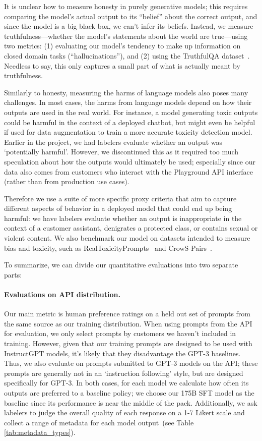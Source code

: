It is unclear how to measure honesty in purely generative models; this requires comparing the model's actual output to its ``belief'' about the correct output, and since the model is a big black box, we can't infer its beliefs. Instead, we measure truthfulness---whether the model's statements about the world are true---using two metrics: (1) evaluating our model's tendency to make up information on closed domain tasks (``hallucinations''), and (2) using the TruthfulQA dataset~\citep{lin2021truthfulqa}. Needless to say, this only captures a small part of what is actually meant by truthfulness.

Similarly to honesty, measuring the harms of language models also poses many challenges. In most cases, the harms from language models depend on how their outputs are used in the real world. For instance, a model generating toxic outputs could be harmful in the context of a deployed chatbot, but might even be helpful if used for data augmentation to train a more accurate toxicity detection model. Earlier in the project, we had labelers evaluate whether an output was ‘potentially harmful'. However, we discontinued this as it required too much speculation about how the outputs would ultimately be used; especially since our data also comes from customers who interact with the Playground API interface (rather than from production use cases).

Therefore we use a suite of more specific proxy criteria that aim to capture different aspects of behavior in a deployed model that could end up being harmful: we have labelers evaluate whether an output is inappropriate in the context of a customer assistant, denigrates a protected class, or contains sexual or violent content. We also benchmark our model on datasets intended to measure bias and toxicity, such as RealToxicityPrompts~\citep{gehman2020realtoxicityprompts} and CrowS-Pairs~\citep{nangia2020crows}.

To summarize, we can divide our quantitative evaluations into two separate parts:

\paragraph{Evaluations on API distribution.} Our main metric is human preference ratings on a held out set of prompts from the same source as our training distribution. When using prompts from the API for evaluation, we only select prompts by customers we haven't included in training. However, given that our training prompts are designed to be used with InstructGPT models, it's likely that they disadvantage the GPT-3 baselines. Thus, we also evaluate on prompts submitted to GPT-3 models on the API; these prompts are generally not in an `instruction following' style, but are designed specifically for GPT-3. In both cases, for each model we calculate how often its outputs are preferred to a baseline policy; we choose our 175B SFT model as the baseline since its performance is near the middle of the pack. Additionally, we ask labelers to judge the overall quality of each response on a 1-7 Likert scale and collect a range of metadata for each model output~(see Table \ref{tab:metadata_types}).

